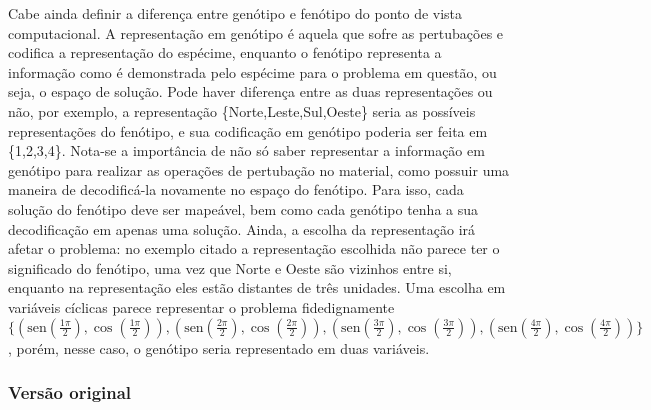 Cabe ainda definir a diferença entre genótipo e fenótipo do ponto de
vista computacional. A representação em genótipo é aquela que sofre as
pertubações e codifica a representação do espécime, enquanto o
fenótipo representa a informação como é demonstrada pelo espécime para
o problema em questão, ou seja, o espaço de solução. Pode haver
diferença entre as duas representações ou não, por exemplo, a
representação \{Norte,Leste,Sul,Oeste\} seria as possíveis
representações do fenótipo, e sua codificação em genótipo poderia ser
feita em \{1,2,3,4\}. Nota-se a importância de não
só saber representar a informação em genótipo para realizar as
operações de pertubação no material, como possuir uma maneira de
decodificá-la novamente no espaço do fenótipo. Para isso, cada solução
do fenótipo deve ser mapeável, bem como cada genótipo tenha a sua
decodificação em apenas uma solução. Ainda, a escolha da representação
irá afetar o problema: no exemplo citado a representação escolhida
não parece ter o significado do fenótipo, uma vez que Norte e Oeste são
vizinhos entre si, enquanto na representação eles estão distantes de três
unidades. Uma escolha em variáveis cíclicas parece representar o
problema fidedignamente
$\{(\text{sen}(\frac{1\pi}{2}),\cos(\frac{1\pi}{2})),
(\text{sen}(\frac{2\pi}{2}),\cos(\frac{2\pi}{2})),
(\text{sen}(\frac{3\pi}{2}),\cos(\frac{3\pi}{2})),
(\text{sen}(\frac{4\pi}{2}),\cos(\frac{4\pi}{2}))\}$, porém, nesse
caso, o genótipo seria representado em duas variáveis.

\subsubsection{Versão original}


